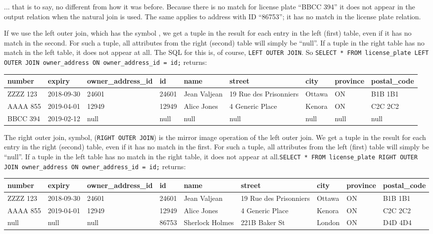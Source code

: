 \documentclass[a4paper]{report}
\begin{document}
... that is to say, no different from how it was before. Because there is no match for license plate ``BBCC 394'' it does not appear in the output relation when the natural join is used. The same applies to address with ID ``86753''; it has no match in the license plate relation. 

If we use the left outer join, which has the symbol {\tiny {}}, we get a tuple in the result for each entry in the left (first) table, even if it has no match in the second. For such a tuple, all attributes from the right (second) table will simply be ``null''. If a tuple in the right table has no match in the left table, it does not appear at all. The SQL for this is, of course, \texttt{LEFT OUTER JOIN}. So \texttt{SELECT * FROM license\_plate LEFT OUTER JOIN owner\_address ON owner\_address\_id = id;} returns:

{\scriptsize
\begin{center}
	\begin{tabular}{|l|l|l|l|l|l|l|l|l|}\hline
		\textbf{number} & \textbf{expiry} & \textbf{owner\_address\_id} & \textbf{id} & \textbf{name} &\textbf{street} & \textbf{city} & \textbf{province} & \textbf{postal\_code} \\ \hline
		ZZZZ 123 & 2018-09-30 & 24601 & 24601 & Jean Valjean & 19 Rue des Prisonniers & Ottawa & ON & B1B 1B1\\ \hline
		AAAA 855 & 2019-04-01 & 12949 & 12949 & Alice Jones & 4 Generic Place & Kenora & ON & C2C 2C2\\ \hline
		BBCC 394 & 2019-02-12 & null & null & null & null & null & null & null \\ \hline
	\end{tabular}
\end{center}
}

The right outer join, symbol, {\tiny {}} (\texttt{RIGHT OUTER JOIN}) is the mirror image operation of the left outer join. We get a tuple in the result for each entry in the right (second) table, even if it has no match in the first. For such a tuple, all attributes from the left (first) table will simply be ``null''. If a tuple in the left table has no match in the right table, it does not appear at all.\texttt{SELECT * FROM license\_plate RIGHT OUTER JOIN owner\_address ON owner\_address\_id = id;} returns:

{\scriptsize
\begin{center}
	\begin{tabular}{|l|l|l|l|l|l|l|l|l|}\hline
		\textbf{number} & \textbf{expiry} & \textbf{owner\_address\_id} & \textbf{id} & \textbf{name} &\textbf{street} & \textbf{city} & \textbf{province} & \textbf{postal\_code} \\ \hline
		ZZZZ 123 & 2018-09-30 & 24601 & 24601 & Jean Valjean & 19 Rue des Prisonniers & Ottawa & ON & B1B 1B1\\ \hline
		AAAA 855 & 2019-04-01 & 12949 & 12949 & Alice Jones & 4 Generic Place & Kenora & ON & C2C 2C2\\ \hline
		null & null & null & 86753 & Sherlock Holmes & 221B Baker St & London & ON & D4D 4D4 \\ \hline
	\end{tabular}
\end{center}
}
\end{document}
